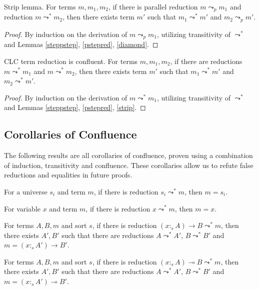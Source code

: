 \documentclass[sigplan,screen,review,anonymous]{acmart}
\newcommand{\stype}[1]{:_#1}
\newcommand{\red}{\leadsto^*}
\newcommand{\pstep}{\leadsto_p}
\begin{document}
\begin{lemma}\label{strip}
  Strip lemma. For terms $m, m_1, m_2$, if there is parallel reduction $m \pstep m_1$ and reduction $m \red m_2$, then there exists term $m'$ such that $m_1 \red m'$ and $m_2 \pstep m'$.
\end{lemma}
\begin{proof}
  By induction on the derivation of $m \pstep m_1$, utilizing transitivity of $\red$ and Lemmas \ref{steppstep}, \ref{pstepred}, \ref{diamond}.
\end{proof}

\begin{theorem}
  CLC term reduction is confluent. For terms $m, m_1, m_2$, if there are reductions $m \red m_1$ and $m \red m_2$, then there exists term $m'$ such that $m_1 \red m'$ and $m_2 \red m'$.
\end{theorem}
\begin{proof}
  By induction on the derivation of $m \red m_1$, utilizing transitivity of $\red$ and Lemmas \ref{steppstep}, \ref{pstepred}, \ref{strip}.
\end{proof}

\subsection{Corollaries of Confluence}
The following results are all corollaries of confluence, proven using a combination of induction, transitivity and confluence. These corollaries allow us to refute false reductions and equalities in future proofs.

\begin{corollary}\label{redsortinv}
  For a universe $s_i$ and term $m$, if there is reduction $s_i \red m$, then $m = s_i$.
\end{corollary}

\begin{corollary}\label{redvarinv}
  For variable $x$ and term $m$, if there is reduction $x \red m$, then $m = x$.
\end{corollary}

\begin{corollary}\label{redarrowinv}
  For terms $A, B, m$ and sort $s$, if there is reduction $(x \stype{s} A) \rightarrow B \red m$, then there exists $A', B'$ such that there are reductions $A \red A'$, $B \red B'$ and $m = (x \stype{s} A') \rightarrow B'$.
\end{corollary}

\begin{corollary}\label{redlolliinv}
  For terms $A, B, m$ and sort $s$, if there is reduction $(x \stype{s} A) \multimap B \red m$, then there exists $A', B'$ such that there are reductions $A \red A'$, $B \red B'$ and $m = (x \stype{s} A') \multimap B'$.
\end{corollary}
\end{document}
